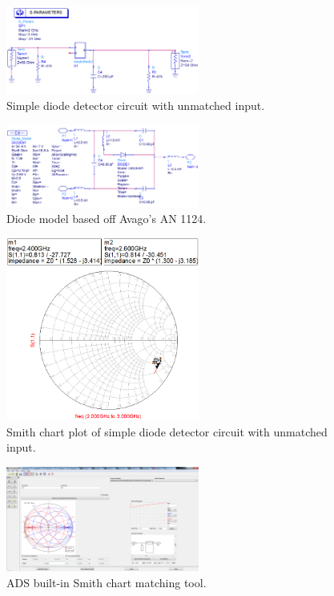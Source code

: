 \documentclass[conference]{IEEEtran}
\begin{document}
\begin{figure}[!htb]
\centering
\includegraphics[width=2.5in]{diode-pics/diodedetectorSimplifiedSchematic.png}
\caption{Simple diode detector circuit with unmatched input.}
\label{fig:DDSchematic}
\end{figure}

\begin{figure}[!htb]
\centering
\includegraphics[width=2.5in]{diode-pics/diodedetectormodel.png}
\caption{Diode model based off Avago's AN 1124.}
\label{fig:diodeModel}
\end{figure}

\begin{figure}[!htb]
\centering
\includegraphics[width=2.5in]{diode-pics/diodedetectorSimplifiedSmithChart.png}
\caption{Smith chart plot of simple diode detector circuit with unmatched input.}
\label{fig:DDPlot}
\end{figure}

\begin{figure}[!htb]
\centering
\includegraphics[width=2.5in]{diode-pics/smithcharttool.png}
\caption{ADS built-in Smith chart matching tool.}
\label{fig:smithchartTool}
\end{figure}
\end{document}
